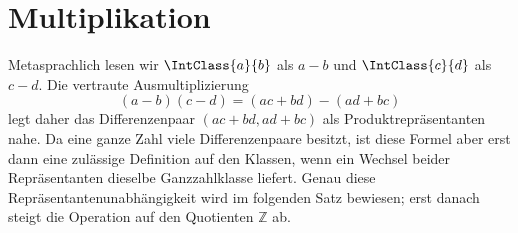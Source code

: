 \section{Multiplikation}

Metasprachlich lesen wir \(\IntClass{a}{b}\) als \(a-b\) und
\(\IntClass{c}{d}\) als \(c-d\). Die vertraute Ausmultiplizierung
\[
  (a-b)(c-d)=(ac+bd)-(ad+bc)
\]
legt daher das Differenzenpaar \((ac+bd,ad+bc)\) als Produktrepräsentanten
nahe. Da eine ganze Zahl viele Differenzenpaare besitzt, ist diese Formel
aber erst dann eine zulässige Definition auf den Klassen, wenn ein Wechsel
beider Repräsentanten dieselbe Ganzzahlklasse liefert. Genau diese
Repräsentantenunabhängigkeit wird im folgenden Satz bewiesen; erst danach
steigt die Operation auf den Quotienten \(\mathbb Z\) ab.

\par{}
\hypertarget{integers.statement.IntegerMultiplicationCompatible}{}
\par{}
\hypertarget{integers.proof.IntegerMultiplicationCompatible}{}
